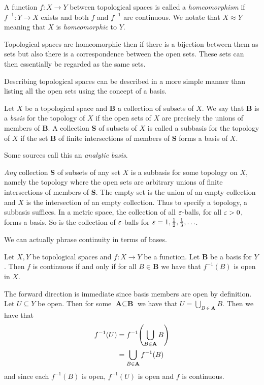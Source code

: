 \documentclass[letterpaper, 11pt]{article}
\begin{document}
\begin{defn}
  A function $f\colon X \to Y$ between topological spaces is called a \emph{homeomorphism} if $f^{-1}\colon Y \to X$ exists and both $f$ and $f^{-1}$ are continuous.
  We notate that $X \approx Y$ meaning that $X$ is \emph{homeomorphic} to $Y$.
\end{defn}

Topological spaces are homeomorphic then if there is a bijection between them as sets but also there is a correspondence between the open sets.
These sets can then essentially be regarded as the same sets.

Describing topological spaces can be described in a more simple manner than listing all the open sets using the concept of a basis.
\begin{defn}
  Let $X$ be a topological space and \textbf{B} a collection of subsets of $X$.
  We say that \textbf{B} is a \emph{basis} for the topology of $X$ if the open sets of $X$ are precisely the unions of members of \textbf{B}.
  A collection \textbf{S} of subsets of $X$ is called a subbasis for the topology of $X$ if the set \textbf{B} of finite intersections of members of \textbf{S} forms a basis of $X$.

  Some sources call this an \emph{analytic basis}.
\end{defn}

\emph{Any} collection \textbf{S} of subsets of any set $X$ is a subbasis for some topology on $X$, namely the topology where the open sets are arbitrary unions of finite intersections of members of \textbf{S}.
The empty set is the union of an empty collection and $X$ is the intersection of an empty collection.
Thus to specify a topology, a subbasis suffices.
In a metric space, the collection of all $\varepsilon$-balls, for all $\varepsilon > 0$, forms a basis.
So is the collection of $\varepsilon$-balls for $\varepsilon = 1, \frac{1}{2}, \frac{1}{3}, \ldots$.

\clearpage

We can actually phrase continuity in terms of bases.
\begin{thrm}\label{thrm: continuity_for_bases}
  Let $X, Y$ be topological spaces and $f\colon X \to Y$ be a function.
  Let \textbf{B} be a basis for $Y$.
  Then $f$ is continuous if and only if for all $B \in \textbf{B}$ we have that $f^{-1}(B)$ is open in $X$.
\end{thrm}
\begin{pf}
  The forward direction is immediate since basis members are open by definition.
  Let $U \subseteq Y$ be open.
  Then for some $\textbf{A} \subseteq \textbf{B}$ we have that $U = \bigcup_{B \in \textbf{A}} B$.
  Then we have that
  \begin{align*}
    f^{-1}(U) &= f^{-1}\pqty{\bigcup_{B \in \textbf{A}} B} \\
              &= \bigcup_{B \in \textbf{A}} f^{-1}(B)
  \end{align*}
  and since each $f^{-1}(B)$ is open, $f^{-1}(U)$ is open and $f$ is continuous.
\end{pf}
\end{document}
